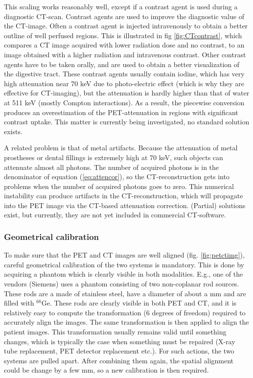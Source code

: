 This scaling works reasonably well, except if a contrast agent is used
during a diagnostic CT-scan. Contrast agents are used to improve the
diagnostic value of the CT-image. Often a contrast agent is injected
intravenously to obtain a better outline of well perfused
regions. This is illustrated in fig \ref{fig:CTcontrast}, which
compares a CT image acquired with lower radiation dose and no
contrast, to an image obtained with a higher radiation and intravenous
contrast. Other contrast agents have to be taken orally, and are used
to obtain a better visualization of the digestive tract. These
contrast agents usually contain iodine, which has very high
attenuation near 70 keV due to photo-electric effect (which is why
they are effective for CT-imaging), but the attenuation is hardly
higher than that of water at 511 keV (mostly Compton interactions). As
a result, the piecewise conversion produces an overestimation of the
PET-attenuation in regions with significant contrast uptake. This
matter is currently being investigated, no standard solution exists.

A related problem is that of metal artifacts. Because the attenuation
of metal prostheses or dental fillings is extremely high at 70 keV,
such objects can attenuate almost all photons. The number of acquired
photons is in the denominator of equation (\ref{eq:attencor}), so the
CT-reconstruction gets into problems when the number of acquired
photons goes to zero. This numerical instability can produce artifacts
in the CT-reconstruction, which will propagate into the PET image via
the CT-based attenuation correction. (Partial) solutions exist, but
currently, they are not yet included in commercial CT-software.

\subsubsection{Geometrical calibration}
To make sure that the PET and CT images are well aligned
(fig. \ref{fig:petctimg}), careful geometrical calibration of the two
systems is mandatory. This is done by acquiring a phantom which is
clearly visible in both modalities. E.g., one of the vendors (Siemens)
uses a phantom consisting of two non-coplanar rod sources. These rods
are a made of stainless steel, have a diameter of about a mm and are
filled with $^{68}$Ge. These rods are clearly visible in both PET and
CT, and it is relatively easy to compute the transformation (6 degrees
of freedom) required to accurately align the images. The same
transformation is then applied to align the patient images. This
transformation usually remains valid until something changes, which is
typically the case when something must be repaired (X-ray tube
replacement, PET detector replacement etc.). For such actions, the two
systems are pulled apart. After combining them again, the spatial
alignment could be change by a few mm, so a new calibration is then
required.


